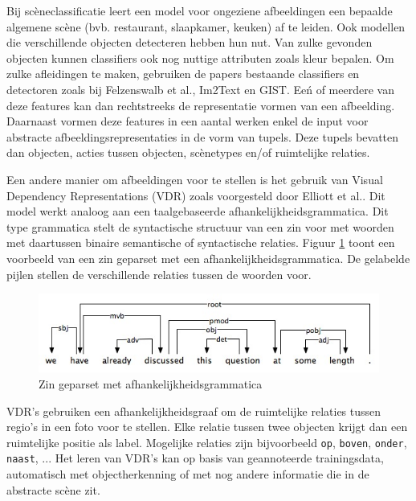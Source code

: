 Bij sc\`eneclassificatie leert een model voor ongeziene afbeeldingen een bepaalde algemene sc\`ene (bvb. restaurant, slaapkamer, keuken) af te leiden. Ook modellen die verschillende objecten detecteren hebben hun nut. Van zulke gevonden objecten kunnen classifiers ook nog nuttige attributen zoals kleur bepalen. Om zulke afleidingen te maken, gebruiken de papers bestaande classifiers en detectoren zoals bij Felzenswalb et al.\cite{Felzenszwalb2008}, Im2Text\cite{Ordonez2011} en GIST\cite{Oliva2006}. Ee\'n of meerdere van deze features kan dan rechtstreeks de representatie vormen van een afbeelding. Daarnaast vormen deze features in een aantal werken\cite{Farhadi2010,Li2011,Mitchell2012,Yang2011} enkel de input voor abstracte afbeeldingsrepresentaties in de vorm van tupels. Deze tupels bevatten dan objecten, acties tussen objecten, sc\`enetypes en/of ruimtelijke relaties.

Een andere manier om afbeeldingen voor te stellen is het gebruik van Visual Dependency Representations (VDR) zoals voorgesteld door Elliott et al.\cite{Elliott2013}. Dit model werkt analoog aan een taalgebaseerde afhankelijkheidsgrammatica. Dit type grammatica stelt de syntactische structuur van een zin voor met woorden met daartussen binaire semantische of syntactische relaties\cite{Jurafsky:2009:SLP:1214993}. Figuur \ref{fig:dep_grammar} toont een voorbeeld van een zin geparset met een afhankelijkheidsgrammatica. De gelabelde pijlen stellen de verschillende relaties tussen de woorden voor.

\begin{figure}[tb]
      \centering
      \includegraphics[width=\linewidth]{Images/dependencygrammar.jpg}
      \caption{Zin geparset met afhankelijkheidsgrammatica\cite{GasserNotes}}
      \label{fig:dep_grammar}
  \end{figure}  

VDR's gebruiken een afhankelijkheidsgraaf om de ruimtelijke relaties tussen regio's in een foto voor te stellen. Elke relatie tussen twee objecten krijgt dan een ruimtelijke positie als label. Mogelijke relaties zijn bijvoorbeeld \texttt{op}, \texttt{boven}, \texttt{onder}, \texttt{naast}, ... Het leren van VDR's kan op basis van geannoteerde trainingsdata, automatisch met objectherkenning\cite{Elliott2015} of met nog andere informatie die in de abstracte sc\`ene zit\cite{Gilberto2015}.  

